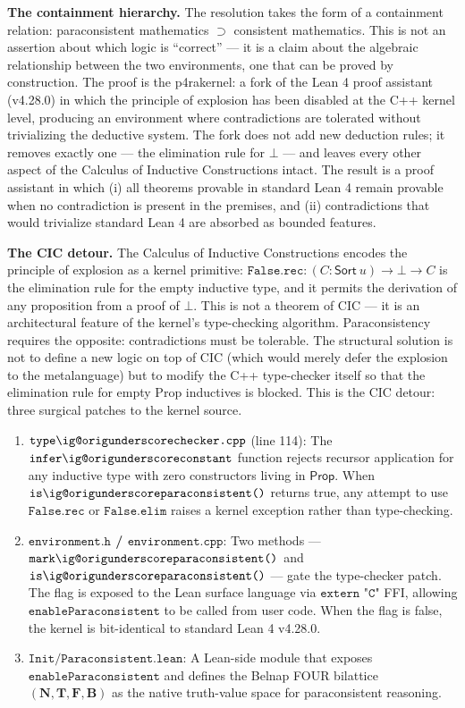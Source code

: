 \documentclass[12pt,a4paper]{article}
\makeatletter
\renewcommand{\_}{\ig@origunderscore\discretionary{}{}{}}
\makeatother
\begin{document}
\textbf{The containment hierarchy.} The resolution takes the form of a containment relation: paraconsistent mathematics
$\supset$ consistent mathematics. This is not an assertion about which logic is ``correct'' --- it is a claim about the algebraic relationship between the two environments, one that can be proved by construction. The proof
is the p4rakernel: a fork of the Lean 4 proof assistant (v4.28.0) in which the principle of explosion has been
disabled at the C++ kernel level, producing an environment where contradictions are tolerated without trivializing the
deductive system. The fork does not add new deduction rules; it removes exactly one --- the elimination rule for
$\bot$ --- and leaves every other aspect of the Calculus of Inductive Constructions intact. The result is a
proof assistant in which (i) all theorems provable in standard Lean 4 remain provable when no contradiction is present
in the premises, and (ii) contradictions that would trivialize standard Lean 4 are absorbed as bounded features.

\textbf{The CIC detour.} The Calculus of Inductive Constructions encodes the principle of explosion as a kernel
primitive: $\texttt{False.rec} : (C : \mathsf{Sort}\ u) \to \bot \to C$ is the elimination rule for the empty
inductive type, and it permits the derivation of any proposition from a proof of $\bot$. This is not a theorem of CIC
--- it is an architectural feature of the kernel's type-checking algorithm. Paraconsistency requires the opposite:
contradictions must be tolerable. The structural solution is not to define a new logic on top of CIC (which would
merely defer the explosion to the metalanguage) but to modify the C++ type-checker itself so that the elimination rule
for empty Prop inductives is blocked. This is the CIC detour: three surgical patches to the kernel source.

\begin{enumerate}
 \item \textbf{$\texttt{type\_checker.cpp}$} (line 114): The $\texttt{infer\_constant}$ function rejects recursor
application for any inductive type with zero constructors living in $\mathsf{Prop}$. When
$\texttt{is\_paraconsistent()}$ returns true, any attempt to use $\texttt{False.rec}$ or $\texttt{False.elim}$ raises
a kernel exception rather than type-checking.
 \item \textbf{$\texttt{environment.h}$ / $\texttt{environment.cpp}$}: Two methods ---
$\texttt{mark\_paraconsistent()}$ and $\texttt{is\_paraconsistent()}$ --- gate the type-checker patch. The flag is
exposed to the Lean surface language via $\texttt{extern "C"}$ FFI, allowing $\texttt{enableParaconsistent}$ to be
called from user code. When the flag is false, the kernel is bit-identical to standard Lean 4 v4.28.0.
 \item \textbf{$\texttt{Init/Paraconsistent.lean}$}: A Lean-side module that exposes
$\texttt{enableParaconsistent}$ and defines the Belnap FOUR bilattice $(\mathbf{N}, \mathbf{T}, \mathbf{F},
\mathbf{B})$ as the native truth-value space for paraconsistent reasoning.
\end{enumerate}
\end{document}
